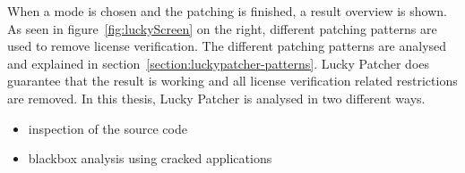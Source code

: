 When a mode is chosen and the patching is finished, a result overview is shown.
As seen in figure~\ref{fig:luckyScreen} on the right, different patching patterns are used to remove license verification.
The different patching patterns are analysed and explained in section~\ref{section:luckypatcher-patterns}.
Lucky Patcher does guarantee that the result is working and all license verification related restrictions are removed.
\newline
In this thesis, Lucky Patcher is analysed in two different ways.
\begin{itemize}
\item inspection of the source code
\item blackbox analysis using cracked applications
\end{itemize}
